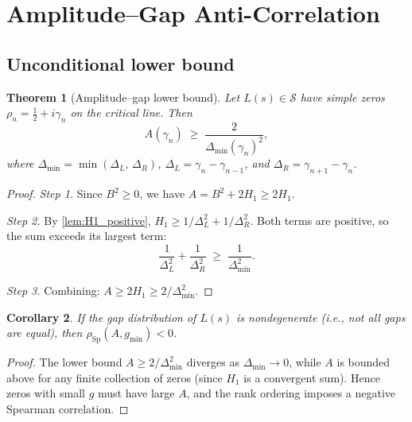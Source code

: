 \documentclass[11pt,a4paper]{article}
\theoremstyle{plain}
\newtheorem{theorem}{Theorem}[section]
\newtheorem{corollary}[theorem]{Corollary}
\theoremstyle{definition}
\begin{document}
\section{Amplitude--Gap Anti-Correlation}
\label{sec:theorem}

\subsection{Unconditional lower bound}

\begin{theorem}[Amplitude--gap lower bound]\label{thm:lower_bound}
Let $L(s) \in \mathcal{S}$ have simple zeros
$\rho_n = \tfrac{1}{2} + i\gamma_n$ on the critical line.  Then
\begin{equation}\label{eq:lower_bound}
  A(\gamma_n) \;\ge\; \frac{2}{\Delta_{\min}(\gamma_n)^2},
\end{equation}
where $\Delta_{\min} = \min(\Delta_L,\,\Delta_R)$,
$\Delta_L = \gamma_n - \gamma_{n-1}$, and
$\Delta_R = \gamma_{n+1} - \gamma_n$.
\end{theorem}

\begin{proof}
\textit{Step 1.}\;
Since $B^2 \ge 0$, we have
$A = B^2 + 2H_1 \ge 2H_1$.

\smallskip\noindent\textit{Step 2.}\;
By \cref{lem:H1_positive},
$H_1 \ge 1/\Delta_L^2 + 1/\Delta_R^2$.
Both terms are positive, so the sum exceeds its largest term:
\[
  \frac{1}{\Delta_L^2} + \frac{1}{\Delta_R^2}
  \;\ge\; \frac{1}{\Delta_{\min}^2}.
\]

\smallskip\noindent\textit{Step 3.}\;
Combining: $A \ge 2H_1 \ge 2/\Delta_{\min}^2$.
\end{proof}

\begin{corollary}\label{cor:anticorrelation}
If the gap distribution of $L(s)$ is nondegenerate (i.e., not all
gaps are equal), then $\rho_{\mathrm{Sp}}(A, g_{\min}) < 0$.
\end{corollary}

\begin{proof}
The lower bound $A \ge 2/\Delta_{\min}^2$ diverges as $\Delta_{\min} \to 0$, while
$A$ is bounded above for any finite collection of zeros (since
$H_1$ is a convergent sum).  Hence zeros with small $g$ must
have large $A$, and the rank ordering imposes a negative Spearman
correlation.
\end{proof}
\end{document}
